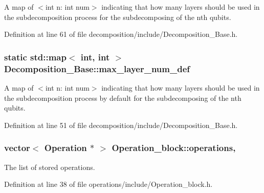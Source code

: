 A map of $<$int n\+: int num$>$ indicating that how many layers should be used in the subdecomposition process for the subdecomposing of the nth qubits. 



Definition at line 61 of file decomposition/include/\+Decomposition\+\_\+\+Base.\+h.

\subsubsection[{\texorpdfstring{max\+\_\+layer\+\_\+num\+\_\+def}{max_layer_num_def}}]{\setlength{\rightskip}{0pt plus 5cm}static std\+::map$<$ int, int $>$ Decomposition\+\_\+\+Base\+::max\+\_\+layer\+\_\+num\+\_\+def\hspace{0.3cm}{\ttfamily [static]}}\hypertarget{class_decomposition___base_a17952d9e72bbc214eb3a1466270b853d}{}\label{class_decomposition___base_a17952d9e72bbc214eb3a1466270b853d}


A map of $<$int n\+: int num$>$ indicating that how many layers should be used in the subdecomposition process by default for the subdecomposing of the nth qubits. 



Definition at line 51 of file decomposition/include/\+Decomposition\+\_\+\+Base.\+h.

\subsubsection[{\texorpdfstring{operations}{operations}}]{\setlength{\rightskip}{0pt plus 5cm}vector$<$ {\bf Operation} $\ast$ $>$ Operation\+\_\+block\+::operations\hspace{0.3cm}{\ttfamily [protected]}, {\ttfamily [inherited]}}\hypertarget{class_operation__block_a1efec4139888e591b59acd7b84497af1}{}\label{class_operation__block_a1efec4139888e591b59acd7b84497af1}


The list of stored operations. 



Definition at line 38 of file operations/include/\+Operation\+\_\+block.\+h.

